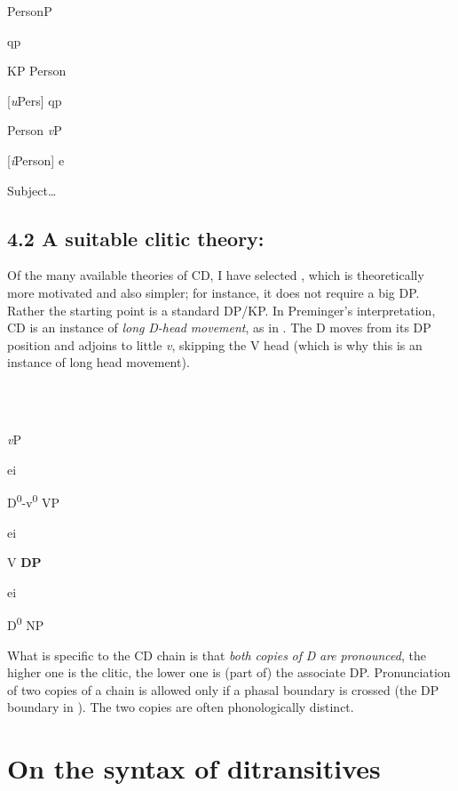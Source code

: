 \documentclass[output=paper,colorlinks,citecolor=brown]{./langscibook}
\begin{document}
          PersonP

qp

KP      Person

[\textit{u}Pers]           qp

    Person        \textit{v}P

    [\textit{i}Person]    e

        Subject…

\subsection{\textbf{4.2} \textbf{A} \textbf{suitable} \textbf{clitic} \textbf{theory:} \textbf{\citealt{Preminger2016}} }

Of the many available theories of CD, I have selected \citet{Preminger2016}, which is theoretically more motivated and also simpler; for instance, it does not require a big DP. Rather the starting point is a standard DP/KP. In Preminger’s interpretation, CD is an instance of \textit{long} \textit{D-head} \textit{movement}, as in . The D moves from its DP position and adjoins to little \textit{v}, skipping the V head (which is why this is an instance of long head movement).

\ea%
    \label{ex:key:30}
    \gll\\
        \\
    \glt
    \z

            \textit{v}P

   ei

  D\textsuperscript{0}{}-v\textsuperscript{0}    VP

    ei

    V    \textbf{DP}

      ei

      D\textsuperscript{0}    NP

What is specific to the CD chain is that \textit{both} \textit{copies} \textit{of} \textit{D} \textit{are} \textit{pronounced}, the higher one is the clitic, the lower one is (part of) the associate DP. Pronunciation of two copies of a chain is allowed only if a phasal boundary is crossed (the DP boundary in ). The two copies are often phonologically distinct. 

\section{On the syntax of ditransitives} %
\end{document}
